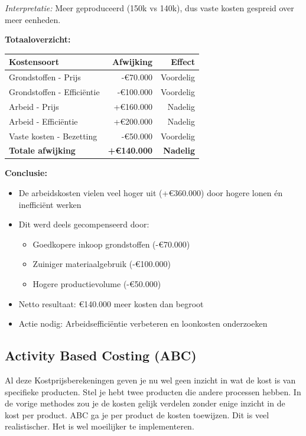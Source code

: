 \documentclass[a4paper,11pt]{article}
\begin{document}
\begin{oefenblok}[title=Afwijkingsanalyse - Begroting vs Realisatie]
    \textit{Interpretatie:} Meer geproduceerd (150k vs 140k), dus vaste kosten gespreid over meer eenheden.
    
    \textbf{Totaaloverzicht:}
    
    \begin{tabular}{lrr}
    \hline
    \textbf{Kostensoort} & \textbf{Afwijking} & \textbf{Effect} \\
    \hline
    Grondstoffen - Prijs & -€70.000 & Voordelig \\
    Grondstoffen - Efficiëntie & -€100.000 & Voordelig \\
    Arbeid - Prijs & +€160.000 & Nadelig \\
    Arbeid - Efficiëntie & +€200.000 & Nadelig \\
    Vaste kosten - Bezetting & -€50.000 & Voordelig \\
    \hline
    \textbf{Totale afwijking} & \textbf{+€140.000} & \textbf{Nadelig} \\
    \hline
    \end{tabular}
    
    \textbf{Conclusie:}
    \begin{itemize}
        \item De arbeidskosten vielen veel hoger uit (+€360.000) door hogere lonen én inefficiënt werken
        \item Dit werd deels gecompenseerd door:
        \begin{itemize}
            \item Goedkopere inkoop grondstoffen (-€70.000)
            \item Zuiniger materiaalgebruik (-€100.000)
            \item Hogere productievolume (-€50.000)
        \end{itemize}
        \item Netto resultaat: €140.000 meer kosten dan begroot
        \item Actie nodig: Arbeidsefficiëntie verbeteren en loonkosten onderzoeken
    \end{itemize}
\end{oefenblok}



\subsection{Activity Based Costing (ABC)}
Al deze Kostprijsberekeningen geven je nu wel geen inzicht
in wat de kost is van specifieke producten.
Stel je hebt twee producten die andere processen hebben.
In de vorige methodes zou je de kosten gelijk verdelen 
zonder enige inzicht in de kost per product.
ABC ga je per product de kosten toewijzen. 
Dit is veel realistischer. Het is wel moeilijker te implementeren.
\newline 
\end{document}
